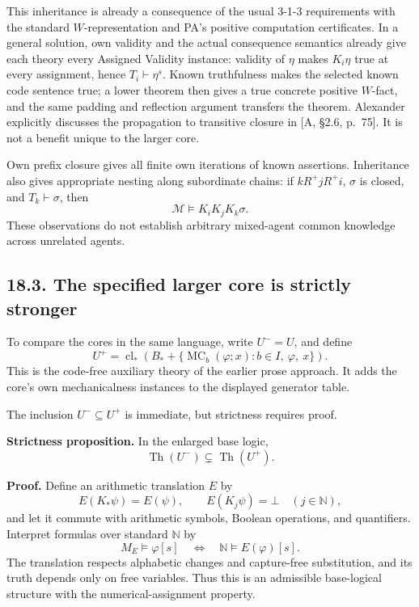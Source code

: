 \documentclass[
  11pt,
  letterpaper,
]{article}
\begin{document}
This inheritance is already a consequence of the usual 3-1-3
requirements with the standard \(W\)-representation and PA's positive
computation certificates. In a general solution, own validity and the
actual consequence semantics already give each theory every Assigned
Validity instance: validity of \(\eta\) makes \(K_i\eta\) true at every
assignment, hence \(T_i\vdash\eta^s\). Known truthfulness makes the
selected known code sentence true; a lower theorem then gives a true
concrete positive \(W\)-fact, and the same padding and reflection
argument transfers the theorem. Alexander explicitly discusses the
propagation to transitive closure in {[}A, §2.6, p.~75{]}. It is not a
benefit unique to the larger core.

Own prefix closure gives all finite own iterations of known assertions.
Inheritance also gives appropriate nesting along subordinate chains: if
\(kR^+jR^+i\), \(\sigma\) is closed, and \(T_k\vdash\sigma\), then \[
\mathcal M\models K_iK_jK_k\sigma.
\] These observations do not establish arbitrary mixed-agent common
knowledge across unrelated agents.

\subsection{18.3. The specified larger core is strictly
stronger}\label{the-specified-larger-core-is-strictly-stronger}

To compare the cores in the same language, write \(U^-=U\), and define
\[
U^+=\operatorname{cl}_*\left(
 B_*+\{\operatorname{MC}_b(\varphi;x):b\in I,\ \varphi,\ x\}
\right).
\tag{P3}
\] This is the code-free auxiliary theory of the earlier prose approach.
It adds the core's own mechanicalness instances to the displayed
generator table.

The inclusion \(U^-\subseteq U^+\) is immediate, but strictness requires
proof.

\textbf{Strictness proposition.} In the enlarged base logic, \[
\operatorname{Th}(U^-)\subsetneq\operatorname{Th}(U^+).
\]

\textbf{Proof.} Define an arithmetic translation \(E\) by \[
E(K_*\psi)=E(\psi),\qquad
E(K_j\psi)=\bot\quad(j\in\mathbb N),
\] and let it commute with arithmetic symbols, Boolean operations, and
quantifiers. Interpret formulas over standard \(\mathbb N\) by \[
M_E\models\varphi[s]\quad\Longleftrightarrow\quad
\mathbb N\models E(\varphi)[s].
\] The translation respects alphabetic changes and capture-free
substitution, and its truth depends only on free variables. Thus this is
an admissible base-logical structure with the numerical-assignment
property.
\end{document}
